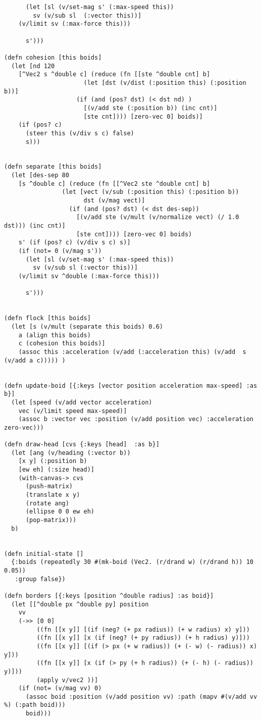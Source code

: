 \documentclass[11pt]{article}
\begin{document}
\begin{verbatim}
      (let [sl (v/set-mag s' (:max-speed this))
	    sv (v/sub sl  (:vector this))]
	(v/limit sv (:max-force this)))

      s')))

(defn cohesion [this boids]
  (let [nd 120
	[^Vec2 s ^double c] (reduce (fn [[ste ^double cnt] b]
				      (let [dst (v/dist (:position this) (:position b))]
					(if (and (pos? dst) (< dst nd) )
					  [(v/add ste (:position b)) (inc cnt)]
					  [ste cnt]))) [zero-vec 0] boids)]
    (if (pos? c)
      (steer this (v/div s c) false)
      s)))


(defn separate [this boids]
  (let [des-sep 80
	[s ^double c] (reduce (fn [[^Vec2 ste ^double cnt] b]
				(let [vect (v/sub (:position this) (:position b))
				      dst (v/mag vect)]
				  (if (and (pos? dst) (< dst des-sep))
				    [(v/add ste (v/mult (v/normalize vect) (/ 1.0 dst))) (inc cnt)]
				    [ste cnt]))) [zero-vec 0] boids)
	s' (if (pos? c) (v/div s c) s)]
    (if (not= 0 (v/mag s'))
      (let [sl (v/set-mag s' (:max-speed this))
	    sv (v/sub sl (:vector this))]
	(v/limit sv ^double (:max-force this)))

      s')))


(defn flock [this boids]
  (let [s (v/mult (separate this boids) 0.6)
	a (align this boids)
	c (cohesion this boids)]
    (assoc this :acceleration (v/add (:acceleration this) (v/add  s (v/add a c))))) ) 


(defn update-boid [{:keys [vector position acceleration max-speed] :as b}]
  (let [speed (v/add vector acceleration)
	vec (v/limit speed max-speed)]
    (assoc b :vector vec :position (v/add position vec) :acceleration zero-vec)))

(defn draw-head [cvs {:keys [head]  :as b}]
  (let [ang (v/heading (:vector b))
	[x y] (:position b)
	[ew eh] (:size head)]
    (with-canvas-> cvs
      (push-matrix)
      (translate x y)
      (rotate ang)
      (ellipse 0 0 ew eh)
      (pop-matrix)))
  b)


(defn initial-state []
  {:boids (repeatedly 30 #(mk-boid (Vec2. (r/drand w) (r/drand h)) 10 0.05))
   :group false})

(defn borders [{:keys [position ^double radius] :as boid}]
  (let [[^double px ^double py] position
	vv
	(->> [0 0]
	     ((fn [[x y]] [(if (neg? (+ px radius)) (+ w radius) x) y]))
	     ((fn [[x y]] [x (if (neg? (+ py radius)) (+ h radius) y)]))
	     ((fn [[x y]] [(if (> px (+ w radius)) (+ (- w) (- radius)) x) y]))
	     ((fn [[x y]] [x (if (> py (+ h radius)) (+ (- h) (- radius)) y)]))
	     (apply v/vec2 ))]
    (if (not= (v/mag vv) 0)
      (assoc boid :position (v/add position vv) :path (mapv #(v/add vv %) (:path boid))) 
      boid)))




\end{verbatim}
\end{document}

